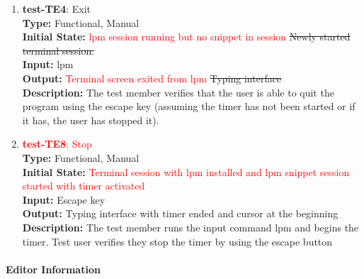 \documentclass[12pt, titlepage]{article}
\begin{document}
\begin{enumerate}
\item{\textbf{test-TE4}: Exit\\}
\textbf{Type:} Functional, Manual \\
\textbf{Initial State:} \textcolor{red}{lpm session running but no snippet in session} \sout{Newly started terminal session.} \\
\textbf{Input:} lpm \\
\textbf{Output:} \textcolor{red}{Terminal screen exited from lpm} \sout{Typing interface}  \\
\textbf{Description:} The test member verifies that the user is able to quit the program using the escape key (assuming the timer has not been started or if it has, the user has stopped it). \\

\color{red}
\item{\textcolor{red}{\textbf{test-TE8}: Stop}} \\
\textbf{Type:} Functional, Manual \\
\textbf{Initial State:} \textcolor{red}{Terminal session with lpm installed and lpm snippet session started with timer activated} \\
\textbf{Input:} Escape key \\
\textbf{Output:} Typing interface with timer ended and cursor at the beginning\\
\textbf{Description:} The test member runs the input command lpm and begins the timer. Test user verifies they stop the timer by using the escape button\\
\end{enumerate}

\paragraph{Editor Information}
\end{document}
